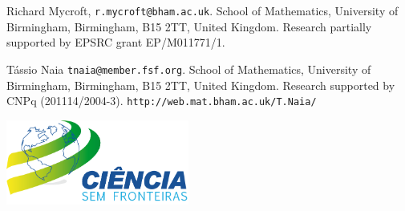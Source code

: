 \documentclass[a1paper,extrafontsizes,32pt]{a0poster}
\begin{document}
\begin{minipage}{.6\textwidth}
  \vfill
  
  \fontsize{16}{18}\selectfont
  Richard Mycroft, \textcolor{dark}{\texttt{r.mycroft@bham.ac.uk}}. School of Mathematics, University of Birmingham, Birmingham, B15 2TT, United Kingdom. Research partially supported by EPSRC grant EP/M011771/1.

  \medskip
  
T\'assio Naia \textcolor{dark}{\texttt{tnaia@member.fsf.org}}. School of Mathematics, University of Birmingham, Birmingham, B15 2TT, United Kingdom. Research supported by CNPq (201114/2004-3). \hfill \textcolor{dark}{\texttt{http://web.mat.bham.ac.uk/T.Naia/}}
\end{minipage}
\begin{minipage}{.38\textwidth}

\begin{center}
\quad\includegraphics[width=6cm]{logo-vetorizada_portugues.png}


\end{center}
\end{minipage}
\end{document}

